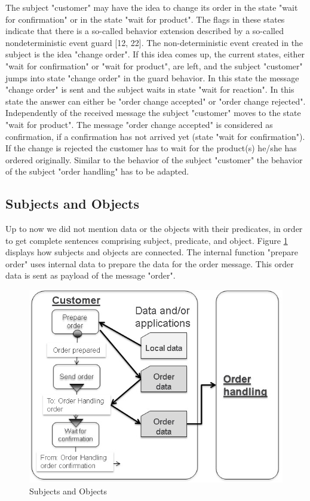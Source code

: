 The subject "customer" may have the idea to change its order in the state "wait for confirmation" or in the state "wait for product". The flags in these states indicate that there is a so-called behavior extension described by a so-called nondeterministic event guard [12, 22]. The non-deterministic event created in the subject is the idea "change order". If this idea comes up, the current states, either "wait for confirmation" or "wait for product", are left, and the subject "customer" jumps into state "change order" in the guard behavior. In this state the message "change order" is sent and the subject waits in state "wait for reaction". In this state the answer can either be "order change accepted" or "order change rejected". Independently of the received message the subject "customer" moves to the state "wait for product". The message "order change accepted" is considered as confirmation, if a confirmation has not arrived yet (state "wait for confirmation"). If the change is rejected the customer has to wait for the product(s) he/she has ordered originally.
Similar to the behavior of the subject "customer" the behavior of the subject "order handling" has to be adapted.


\subsection{Subjects and Objects}
\label{SUbjects-Objects}
Up to now we did not mention data or the objects with their predicates, in order to get complete sentences comprising subject, predicate, and object. Figure \ref{fig:subjectobject} displays how subjects and objects are connected. The internal function "prepare order" uses internal data to prepare the data for the order message. This order data is sent as payload of the message "order".


\begin{figure}[ph]
	\centering
	\includegraphics[width=0.7\linewidth]{20181026-Ontologie-Bilder/Grafiken-Ontologie/SUbjectExecution/SUbjectObject}
	\caption[Subjects and Objects]{Subjects and Objects}
	\label{fig:subjectobject}
\end{figure}

